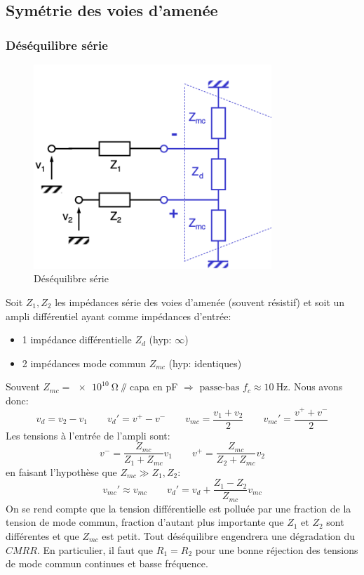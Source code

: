 \subsection{Symétrie des voies d'amenée}
\subsubsection{Déséquilibre série}
\begin{figure}[H] 
	\centering 
	\includegraphics[width=0.8\textwidth,height=10\baselineskip,keepaspectratio]{ch3/image17} 
	\caption{Déséquilibre série} 
\end{figure}
Soit \(Z_1, Z_2\) les impédances série des voies d'amenée (souvent résistif) et soit un ampli différentiel ayant comme impédances d'entrée:
\begin{itemize}
	\item 1 impédance différentielle \(Z_d\) (hyp: \(\infty\))
	\item 2 impédances mode commun \(Z_{mc}\) (hyp: identiques)
\end{itemize}
Souvent \(Z_{mc} = \SI{e10}{\ohm}\)  \(\parallelsum\) capa en \si{\pico\farad} \(\Rightarrow \text{ passe-bas }f_c\approx \SI{10}{\hertz}\). Nous avons donc:
\[v_d = v_2-v_1\qquad v_d'=v^+-v^-\qquad v_{mc}=\frac{v_1+v_2}{2}\qquad v_{mc}'=\frac{v^++v^-}{2}\]
Les tensions à l'entrée de l'ampli sont:
\[v^-=\frac{Z_{mc}}{Z_1+Z_{mc}}v_1\qquad v^+=\frac{Z_{mc}}{Z_2+Z_{mc}}v_2\]
en faisant l'hypothèse que \(Z_{mc}\gg Z_1, Z_2\):
\[v_{mc}'\approx v_{mc}\qquad v_d'=v_d+\frac{Z_1-Z_2}{Z_{mc}}v_{mc}\]
On se rend compte que la tension différentielle est polluée par une fraction de la tension de mode commun, fraction d'autant plus importante que \(Z_1\text{ et }Z_2\) sont différentes et que \(Z_{mc}\) est petit. Tout déséquilibre engendrera une dégradation du \(CMRR\). En particulier, il faut que \(R_1=R_2\) pour une bonne réjection des tensions de mode commun continues et basse fréquence.
